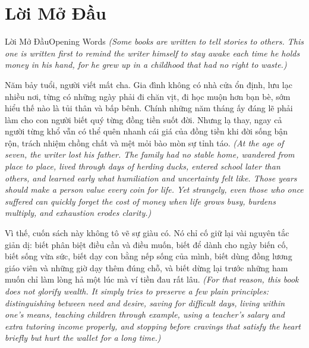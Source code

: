 \chapter*{Lời Mở Đầu}

\begin{truyen}{Lời Mở Đầu}{Opening Words}
\textit{(Some books are written to tell stories to others. This one is written first to remind the writer himself to stay awake each time he holds money in his hand, for he grew up in a childhood that had no right to waste.)}

Năm bảy tuổi, người viết mất cha. Gia đình không có nhà cửa ổn định, lưu lạc nhiều nơi, từng có những ngày phải đi chăn vịt, đi học muộn hơn bạn bè, sớm hiểu thế nào là tủi thân và bấp bênh. Chính những năm tháng ấy đáng lẽ phải làm cho con người biết quý từng đồng tiền suốt đời. Nhưng lạ thay, ngay cả người từng khổ vẫn có thể quên nhanh cái giá của đồng tiền khi đời sống bận rộn, trách nhiệm chồng chất và mệt mỏi bào mòn sự tỉnh táo.
\textit{(At the age of seven, the writer lost his father. The family had no stable home, wandered from place to place, lived through days of herding ducks, entered school later than others, and learned early what humiliation and uncertainty felt like. Those years should make a person value every coin for life. Yet strangely, even those who once suffered can quickly forget the cost of money when life grows busy, burdens multiply, and exhaustion erodes clarity.)}

Vì thế, cuốn sách này không tô vẽ sự giàu có. Nó chỉ cố giữ lại vài nguyên tắc giản dị: biết phân biệt điều cần và điều muốn, biết để dành cho ngày biến cố, biết sống vừa sức, biết dạy con bằng nếp sống của mình, biết dùng đồng lương giáo viên và những giờ dạy thêm đúng chỗ, và biết dừng lại trước những ham muốn chỉ làm lòng hả một lúc mà ví tiền đau rất lâu.
\textit{(For that reason, this book does not glorify wealth. It simply tries to preserve a few plain principles: distinguishing between need and desire, saving for difficult days, living within one’s means, teaching children through example, using a teacher’s salary and extra tutoring income properly, and stopping before cravings that satisfy the heart briefly but hurt the wallet for a long time.)}


\end{truyen}
